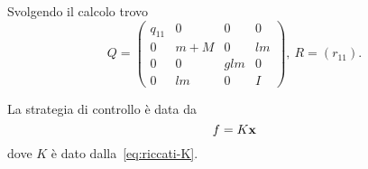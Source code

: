 Svolgendo il calcolo trovo
\begin{equation}
    Q = \left(
    \begin{array}{cccc}
        q_{11} & 0 & 0 & 0 \\
        0 & m+M & 0 & lm \\
        0 & 0 & glm & 0 \\
        0 & lm & 0 & I
    \end{array}
    \right), \
    R = \left(
    r_{11}
    \right).
    \label{eq:q-r-matrices}
\end{equation}

La strategia di controllo è data da
\begin{equation*}
    f = K\mathbf{x}
\end{equation*}
dove $K$ è dato dalla~\eqref{eq:riccati-K}.